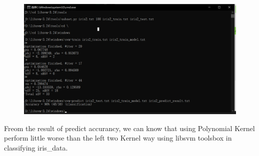 \documentclass[runningheads]{llncs}
\begin{document}
\begin{figure}[H]
    \centering
    \includegraphics[scale=0.8]{RBF2.PNG}
\end{figure}

Freom the result of predict accurancy, we can know 
that using Polynomial Kernel perform little worse
than the left two Kernel way using libsvm toolsbox in
classifying iris\_data.
\end{document}
